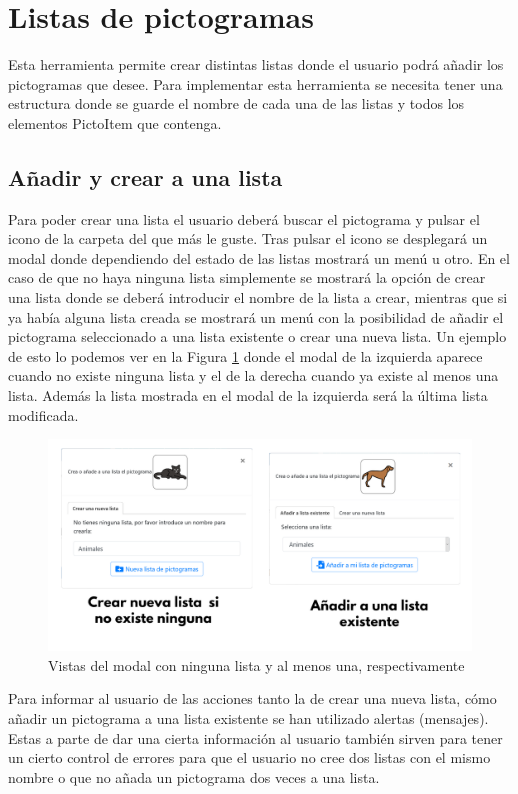 \section{Listas de pictogramas}
\label{listapictos}

Esta herramienta permite crear distintas listas donde el usuario podrá añadir los pictogramas que desee.
Para implementar esta herramienta se necesita tener una estructura donde se guarde el nombre de cada una de las listas y todos los elementos PictoItem que contenga. 

\subsection{Añadir y crear a una lista}

Para poder crear una lista el usuario deberá buscar el pictograma y pulsar el icono de la carpeta del que más le guste. Tras pulsar el icono se desplegará un modal donde dependiendo del estado de las listas mostrará un menú u otro. En el caso de que no haya ninguna lista simplemente se mostrará la opción de crear una lista donde se deberá introducir el nombre de la lista a crear, mientras que si ya había alguna lista creada se mostrará un menú con la posibilidad de añadir el pictograma seleccionado a una lista existente o crear una nueva lista. Un ejemplo de esto lo podemos ver en la Figura \ref{fig:modalescoleccion} donde el modal de la izquierda aparece cuando no existe ninguna lista y el de la derecha cuando ya existe al menos una lista. Además la lista mostrada en el modal de la izquierda será la última lista modificada.

\begin{figure}[h!]
	\centering
	\includegraphics[width=0.7\linewidth]{Imagenes/Bitmap/modalesColeccion}
	\caption{Vistas del modal con ninguna lista y al menos una, respectivamente}
	\label{fig:modalescoleccion}
\end{figure}


Para informar al usuario de las acciones tanto la de crear una nueva lista, cómo añadir un pictograma a una lista existente se han utilizado alertas (mensajes). Estas a parte de dar una cierta información al usuario también sirven para tener un cierto control de errores para que el usuario no cree dos listas con el mismo nombre o que no añada un pictograma dos veces a una lista.


